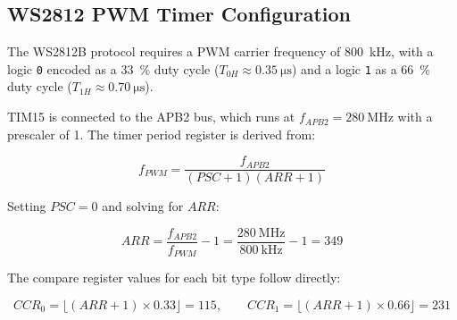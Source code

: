 \subsection{WS2812 PWM Timer Configuration}

The WS2812B protocol requires a PWM carrier frequency of \SI{800}{\kilo\hertz}, 
with a logic \texttt{0} encoded as a \SI{33}{\percent} duty cycle ($T_{0H} \approx \SI{0.35}{\micro\second}$) 
and a logic \texttt{1} as a \SI{66}{\percent} duty cycle ($T_{1H} \approx \SI{0.70}{\micro\second}$).\cite{WS2812Bdatasheet}

TIM15 is connected to the APB2 bus, which runs at $f_{APB2} = \SI{280}{\mega\hertz}$ 
with a prescaler of 1. The timer period register is derived from:

\begin{equation}
    f_{PWM} = \frac{f_{APB2}}{(PSC + 1)(ARR + 1)}
\end{equation}

Setting $PSC = 0$ and solving for $ARR$:

\begin{equation}
    ARR = \frac{f_{APB2}}{f_{PWM}} - 1 = \frac{\SI{280}{\mega\hertz}}{\SI{800}{\kilo\hertz}} - 1 = 349
\end{equation}

The compare register values for each bit type follow directly:

\begin{equation}
    CCR_{0} = \lfloor (ARR+1) \times 0.33 \rfloor = 115, \qquad
    CCR_{1} = \lfloor (ARR+1) \times 0.66 \rfloor = 231
\end{equation}
